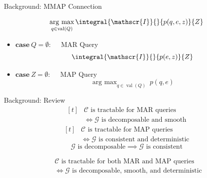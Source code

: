 \documentclass[aspectratio=169]{beamer}
\DeclareMathOperator*{\argmax}{arg\ max}
\DeclareMathOperator{\val}{val}
\begin{document}
  \begin{frame}{Background: MMAP Connection}
    \begin{mybox}
      \[
        \argmax_{q\in\val(Q)} \integral{\mathscr{I}}{}{p(q,e,z)}{Z}
      \]
    \end{mybox}
    \begin{itemize}
      \item $\mathbf{case}\ Q=\emptyset :\quad $ MAR Query
      \[
        \integral{\mathscr{I}}{}{p(e,z)}{Z}
      \]
      \item $\mathbf{case}\ Z=\emptyset :\quad $ MAP Query
      \[
        \argmax_{q\in\val(Q)}\ p(q,e)
      \]
    \end{itemize}
  \end{frame}

  \begin{frame}{Background: Review}
    \[
      \begin{aligned}[t]
        &\text{$\mathscr{C}$ is tractable for MAR queries} \\
        &\iff \text{$\mathscr{G}$ is decomposable and smooth}
      \end{aligned}
    \]
    \[
      \begin{aligned}[t]
        &\text{$\mathscr{C}$ is tractable for MAP queries} \\
        &\iff \text{$\mathscr{G}$ is consistent and deterministic}
      \end{aligned}
    \]
    \[
      \text{$\mathscr{G}$ is decomposable} \implies \text{$\mathscr{G}$ is consistent}
    \]
    \begin{mybox}
      \begin{align*}
        &\text{$\mathscr{C}$ is tractable for both MAR and MAP queries} \\
        &\iff \text{$\mathscr{G}$ is decomposable, smooth, and deterministic }
      \end{align*}
    \end{mybox}
  \end{frame}
\end{document}
